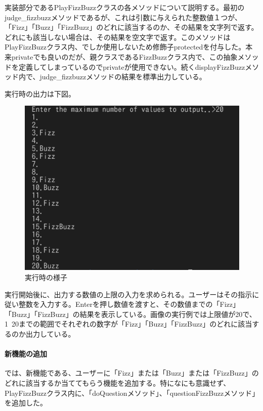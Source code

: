 \documentclass[dvipdfmx]{jsarticle}
\begin{document}
実装部分であるPlayFizzBuzzクラスの各メソッドについて説明する。最初のjudge\_fizzbuzzメソッドであるが、これは引数に与えられた整数値１つが、「Fizz」「Buzz」「FizzBuzz」のどれに該当するのか、その結果を文字列で返す。どれにも該当しない場合は、その結果を空文字で返す。このメソッドはPlayFizzBuzzクラス内、でしか使用しないため修飾子protectedを付与した。本来privateでも良いのだが、親クラスであるFizzBuzzクラス内で、この抽象メソッドを定義してしまっているのでprivateが使用できない。続くdisplayFizzBuzzメソッド内で、judge\_fizzbuzzメソッドの結果を標準出力している。\par
実行時の出力は下図。
\begin{figure}[H]
  \centering
  \includegraphics[scale=0.6]{ImgMovies/prod01-result1.png}
  \caption{実行時の様子}
\end{figure}
実行開始後に、出力する数値の上限の入力を求められる。ユーザーはその指示に従い整数を入力する。Enterを押し数値を渡すと、その数値までの「Fizz」「Buzz」「FizzBuzz」の結果を表示している。画像の実行例では上限値が20で、1~20までの範囲でそれぞれの数字が「Fizz」「Buzz」「FizzBuzz」のどれに該当するのか出力している。
\paragraph{新機能の追加}
では、新機能である、ユーザーに「Fizz」または「Buzz」または「FizzBuzz」のどれに該当するか当ててもらう機能を追加する。特になにも意識せず、PlayFizzBuzzクラス内に、「doQuestionメソッド」、「questionFizzBuzzメソッド」を追加した。
\end{document}
